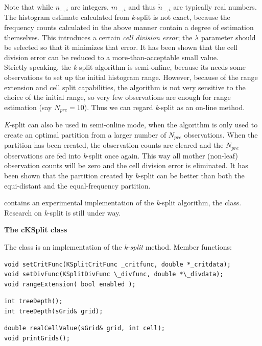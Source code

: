 Note that while $n_{...,i}$ are integers, $m_{...,i}$ and thus
$\tilde{n}_{...,i}$ are typically real numbers. The histogram estimate
calculated from \textit{k}-split is not exact, because the frequency
counts calculated in the above manner contain a degree of estimation
themselves. This introduces a certain \textit{cell division error};
the $\lambda$ parameter should be selected so that it minimizes that
error. It has been shown that the cell division error can
be reduced to a more-than-acceptable small value.\\
Strictly speaking, the \textit{k}-split algorithm is semi-online,
because its needs some observations to set up the initial histogram
range.  However, because of the range extension and cell split
capabilities, the algorithm is not very sensitive to the choice of the
initial range, so very few observations are enough for range
estimation (say $N_{pre}=10$). Thus we can regard \textit{k}-split as
an on-line method.

\textit{K}-split can also be used in semi-online mode, when the
algorithm is only used to create an optimal partition from a larger
number of $N_{pre}$ observations. When the partition has been created,
the observation counts are cleared and the $N_{pre}$ observations are
fed into \textit{k}-split once again. This way all mother (non-leaf)
observation counts will be zero and the cell division error is
eliminated. It has been shown that the partition created by
\textit{k}-split can be better than both the equi-distant and the
equal-frequency partition.


{\opp} contains an experimental implementation of the \textit{k}-split
algorithm, the  class. Research on \textit{k}-split is
still under way.


\textbf{The cKSplit class}

The  class is an implementation of the \textit{k-split} method.
Member functions:

%
%

\begin{verbatim}
void setCritFunc(KSplitCritFunc _critfunc, double *_critdata);
void setDivFunc(KSplitDivFunc \_divfunc, double *\_divdata);
void rangeExtension( bool enabled );
\end{verbatim}


\begin{verbatim}
int treeDepth();
int treeDepth(sGrid& grid);
\end{verbatim}

\begin{verbatim}
double realCellValue(sGrid& grid, int cell);
void printGrids();
\end{verbatim}

